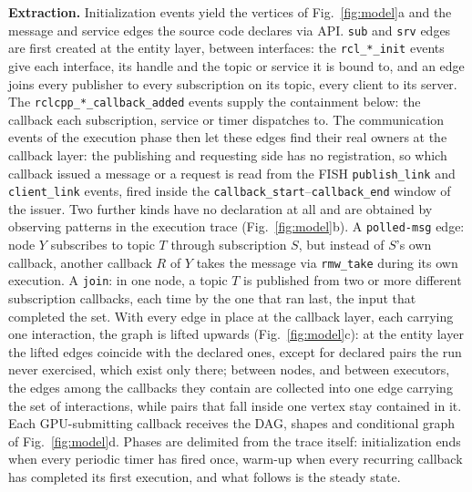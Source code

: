 \noindent\textbf{Extraction.} Initialization events yield the vertices of
Fig.~\ref{fig:model}a and the message and service edges the source code
declares via API. \texttt{sub} and \texttt{srv} edges are first created at
the entity layer, between interfaces: the \texttt{rcl\_*\_init} events give
each interface, its handle and the topic or service it is bound to, and an
edge joins every publisher to every subscription on its topic, every client
to its server. The \texttt{rclcpp\_*\_callback\_added} events supply the
containment below: the callback each subscription, service or timer
dispatches to. The communication events of the execution phase then let
these edges find their real owners at the callback layer: the publishing and
requesting side has no registration, so which callback issued a message or a
request is read from the FISH \texttt{publish\_link} and \texttt{client\_link}
events, fired inside the \texttt{callback\_start}--\texttt{callback\_end}
window of the issuer. Two further kinds have no declaration at all and are
obtained by observing patterns in the execution trace
(Fig.~\ref{fig:model}b). A \texttt{polled-msg} edge: node $Y$ subscribes to
topic $T$ through subscription $S$, but instead of $S$'s own callback,
another callback $R$ of $Y$ takes the message via \texttt{rmw\_take} during
its own execution. A \texttt{join}: in one node, a topic $T$ is published
from two or more different subscription callbacks, each time by the one that
ran last, the input that completed the set. With every edge in place at the
callback layer, each carrying one interaction, the graph is lifted upwards
(Fig.~\ref{fig:model}c): at the entity layer the lifted edges coincide with
the declared ones, except for declared pairs the run never exercised, which
exist only there; between nodes, and between executors, the edges among the
callbacks they contain are collected into one edge carrying the set of
interactions, while pairs that fall inside one vertex stay contained in it.
Each GPU-submitting callback receives the DAG, shapes and conditional graph
of Fig.~\ref{fig:model}d. Phases are delimited from the trace itself:
initialization ends when every periodic timer has fired once, warm-up when
every recurring callback has completed its first execution, and what follows
is the steady state.
